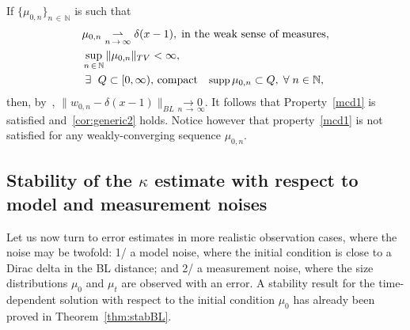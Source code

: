 \documentclass[AHL,Unicode,longabstracts,published]{cedram}
\newcommand*\N{\mathbb{N}}
\newcommand*\supp{{\mbox{\small\rm supp}}\,}
\let\oldexists\exists
\renewcommand*{\exists}{\mathrel{\oldexists}}
\let\oldforall\forall
\renewcommand*{\forall}{\mathrel{\oldforall}}
\begin{document}
\begin{rema}
If $\{\mu _{0, n}\}_{n\,\in\,\N}$ is such that
\begin{equation*}
\begin{aligned}
& \mu _{0, n} \underset{n\,\to\,\infty}{ \rightharpoonup}\delta (x-1),\; \text{in the weak sense of measures},\\
&\sup_{n\,\in\,\N}\|\mu _{0, n}\|_{TV}<\infty,\\
&\exists\,\,Q\subset [0, \infty),\,\text{compact}\quad\supp \mu _{0, n}\subset Q,\; \forall n\in \N,
\end{aligned}
\end{equation*}
then, by~\cite[Proposition~4]{Hanin}, $\|w_{0, n}-\delta (x-1)\|_{BL}\underset{n\,\to\,\infty}{ \longrightarrow 0}$. It follows that Property~\eqref{mcd1} is satisfied and~\eqref{cor:generic2} holds. Notice however that property~\eqref{mcd1} is not satisfied for any weakly-converging sequence $\mu_{0,n}$.
\end{rema}



\subsection{Stability of the \texorpdfstring{$\kappa$}{kappa} estimate with respect to model and measurement noises}

Let us now turn to error estimates in more realistic observation cases, where the noise may be twofold:
1/ a model noise, where the initial condition is close to a Dirac delta in the BL distance;
and 2/ a measurement noise, where the size distributions $\mu_0$ and $\mu_t$ are observed with an error. A stability result for the time-dependent solution with respect to the initial condition $\mu _0$ has already been proved in Theorem~\ref{thm:stabBL}.
\end{document}
